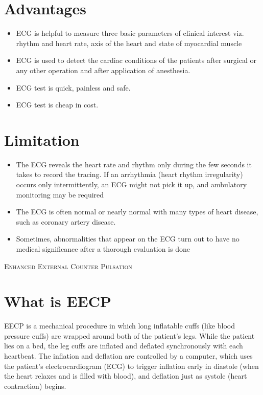 \documentclass[11pt]{article}
\begin{document}
\section*{Advantages}
\begin{itemize}
\item ECG is helpful to measure three basic parameters of clinical interest viz. rhythm and heart rate, axis of the heart and state of myocardial muscle

\item ECG is used to detect the cardiac conditions of the patients after surgical or any other operation and after application of anesthesia.

\item ECG test is quick, painless and safe.

\item ECG test is cheap in cost.
\end{itemize}

\section*{Limitation}
\begin{itemize}
\item The ECG reveals the heart rate and rhythm only during the few seconds it takes to record the tracing. If an arrhythmia (heart rhythm irregularity) occurs only intermittently, an ECG might not pick it up, and ambulatory monitoring may be required
\item The ECG is often normal or nearly normal with many types of heart disease, such as coronary artery disease.
\item Sometimes, abnormalities that appear on the ECG turn out to have no medical significance after a thorough evaluation is done
\end{itemize}

\clearpage
\newpage



\textsc{\LARGE  Enhanced External Counter Pulsation}\\[1.5cm]
\section*{What is EECP}

EECP is a mechanical procedure in which long inflatable cuffs (like blood pressure cuffs) are wrapped around both of the patient’s legs. While the patient lies on a bed, the leg cuffs are inflated and deflated synchronously with each heartbeat.
The inflation and deflation are controlled by a computer, which uses the patient’s electrocardiogram (ECG) to trigger inflation early in diastole (when the heart relaxes and is filled with blood), and deflation just as systole (heart contraction) begins.
\end{document}

